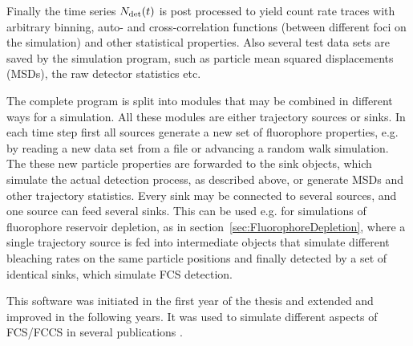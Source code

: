 Finally the time series  ${N}_{\text{det}}(t)$ is post processed to yield count rate traces with arbitrary binning, auto- and cross-correlation functions (between different foci on the simulation) and other statistical properties. Also several test data sets are saved by the simulation program, such as particle mean squared displacements (MSDs), the raw detector statistics etc.

The complete program is split into modules that may be combined in different ways for a simulation. All these modules are either trajectory sources or sinks. In each time step first all sources generate a new set of fluorophore properties, e.g. by reading a new data set from a file or advancing a random walk simulation. The these new particle properties are forwarded to the sink objects, which simulate the actual detection process, as described above, or generate MSDs and other trajectory statistics. Every sink may be connected to several sources, and one source can feed several sinks. This can be used e.g. for simulations of fluorophore reservoir depletion, as in section~\ref{sec:FluorophoreDepletion}, where a single trajectory source is fed into intermediate objects that simulate different bleaching rates on the same particle positions and finally detected by a set of identical sinks, which simulate FCS detection.

This software was initiated in the first year of the thesis and extended and improved in the following years. It was used to simulate different aspects of FCS/FCCS in several publications \cite{WOCJAN2009,BUCHHO2012,SINGHKRIEGER2013,KRIEGE2014}.
